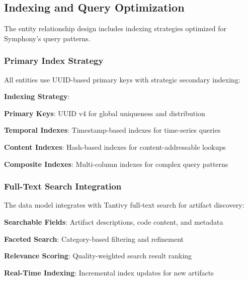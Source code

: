 \subsection*{Indexing and Query Optimization}

The entity relationship design includes indexing strategies optimized for Symphony's query patterns.

\subsubsection*{Primary Index Strategy}

All entities use UUID-based primary keys with strategic secondary indexing:

\begin{alertbox}
\textbf{Indexing Strategy}:
\begin{compactlist}
    \item \textbf{Primary Keys}: UUID v4 for global uniqueness and distribution
    \item \textbf{Temporal Indexes}: Timestamp-based indexes for time-series queries
    \item \textbf{Content Indexes}: Hash-based indexes for content-addressable lookups
    \item \textbf{Composite Indexes}: Multi-column indexes for complex query patterns
\end{compactlist}
\end{alertbox}

\subsubsection*{Full-Text Search Integration}

The data model integrates with Tantivy full-text search for artifact discovery:

\begin{compactlist}
    \item \textbf{Searchable Fields}: Artifact descriptions, code content, and metadata
    \item \textbf{Faceted Search}: Category-based filtering and refinement
    \item \textbf{Relevance Scoring}: Quality-weighted search result ranking
    \item \textbf{Real-Time Indexing}: Incremental index updates for new artifacts
\end{compactlist}

